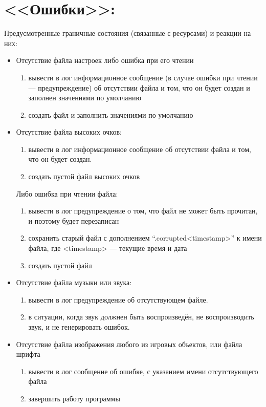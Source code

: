 \documentclass[12pt,a4paper,fullpage]{article}
\begin{document}
\section{<<Ошибки>>:}
Предусмотренные граничные состояния (связанные с ресурсами) и реакции на них:
\begin{itemize}
\item Отсутствие файла настроек либо ошибка при его чтении
  \begin{enumerate}
  \item вывести в лог информационное сообщение (в случае ошибки при чтении --- предупреждение) об отсутствии файла и том, что он будет создан и заполнен значениями по умолчанию
  \item создать файл и заполнить значениями по умолчанию
  \end{enumerate}
\item Отсутствие файла высоких очков:
  \begin{enumerate}
  \item вывести в лог информационное сообщение об отсутствии файла и том, что он будет создан.
  \item создать пустой файл высоких очков
  \end{enumerate}
  Либо ошибка при чтении файла:
  \begin{enumerate}
  \item вывести в лог предупреждение о том, что файл не может быть прочитан, и поэтому будет перезаписан
  \item сохранить старый файл с дополнением ``.corrupted<timestamp>'' к имени файла, где <timestamp> --- текущие время и дата
  \item создать пустой файл
  \end{enumerate}
\item Отсутствие файла музыки или звука:
  \begin{enumerate}
  \item вывести в лог предупреждение об отсутствующем файле.
  \item в ситуации, когда звук должнен быть воспроизведён, не воспроизводить звук, и не генерировать ошибок.
  \end{enumerate}
\item Отсутствие файла изображения любого из игровых объектов, или файла шрифта
  \begin{enumerate}
  \item вывести в лог сообщение об ошибке, с указанием имени отсутствующего файла
  \item завершить работу программы
  \end{enumerate}
\end{itemize}
\end{document}
